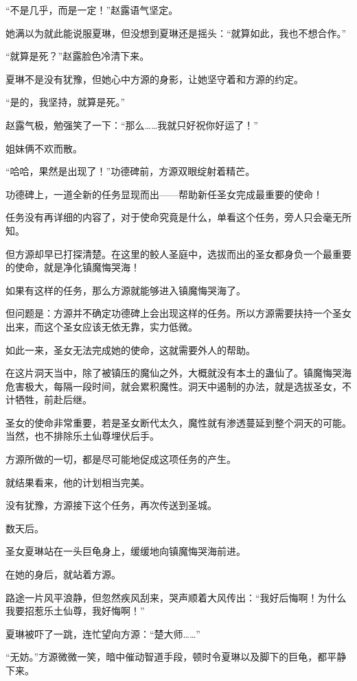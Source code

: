 \begin{this_body}
“不是几乎，而是一定！”赵露语气坚定。

她满以为就此能说服夏琳，但没想到夏琳还是摇头：“就算如此，我也不想合作。”

“就算是死？”赵露脸色冷清下来。

夏琳不是没有犹豫，但她心中方源的身影，让她坚守着和方源的约定。

“是的，我坚持，就算是死。”

赵露气极，勉强笑了一下：“那么……我就只好祝你好运了！”

姐妹俩不欢而散。

“哈哈，果然是出现了！”功德碑前，方源双眼绽射着精芒。

功德碑上，一道全新的任务显现而出——帮助新任圣女完成最重要的使命！

任务没有再详细的内容了，对于使命究竟是什么，单看这个任务，旁人只会毫无所知。

但方源却早已打探清楚。在这里的鲛人圣庭中，选拔而出的圣女都身负一个最重要的使命，就是净化镇魔悔哭海！

如果有这样的任务，那么方源就能够进入镇魔悔哭海了。

但问题是：方源并不确定功德碑上会出现这样的任务。所以方源需要扶持一个圣女出来，而这个圣女应该无依无靠，实力低微。

如此一来，圣女无法完成她的使命，这就需要外人的帮助。

在这片洞天当中，除了被镇压的魔仙之外，大概就没有本土的蛊仙了。镇魔悔哭海危害极大，每隔一段时间，就会累积魔性。洞天中遏制的办法，就是选拔圣女，不计牺牲，前赴后继。

圣女的使命非常重要，若是圣女断代太久，魔性就有渗透蔓延到整个洞天的可能。当然，也不排除乐土仙尊埋伏后手。

方源所做的一切，都是尽可能地促成这项任务的产生。

就结果看来，他的计划相当完美。

没有犹豫，方源接下这个任务，再次传送到圣城。

数天后。

圣女夏琳站在一头巨龟身上，缓缓地向镇魔悔哭海前进。

在她的身后，就站着方源。

路途一片风平浪静，但忽然疾风刮来，哭声顺着大风传出：“我好后悔啊！为什么我要招惹乐土仙尊，我好悔啊！”

夏琳被吓了一跳，连忙望向方源：“楚大师……”

“无妨。”方源微微一笑，暗中催动智道手段，顿时令夏琳以及脚下的巨龟，都平静下来。


\end{this_body}
